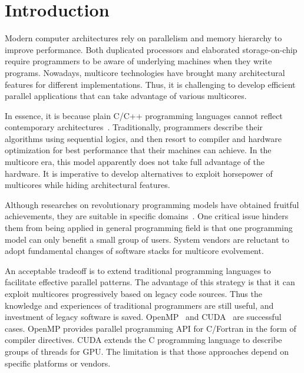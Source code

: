 \section{Introduction}
\label{sec:Intro}

Modern computer architectures rely on parallelism and memory
hierarchy to improve performance. Both duplicated processors and
elaborated storage-on-chip require programmers to be aware of underlying
machines when they write programs. Nowadays,
multicore technologies have brought many architectural features for
different implementations. Thus, it is challenging to develop
efficient parallel applications that can take advantage of various multicores.

In essence, it is because plain C/C++ programming languages
cannot reflect contemporary architectures~\cite{cml}. Traditionally, programmers
describe their algorithms using sequential logics, and then resort to compiler
and hardware optimization for best performance that their machines can achieve.
In the multicore era, this model apparently does not take full advantage of the
hardware. It is imperative to develop alternatives to exploit horsepower
of multicores while hiding architectural features.

Although researches on revolutionary programming models have obtained
fruitful achievements, they are suitable in specific
domains~\cite{gmapreduce, erlang, haskell}.
One critical issue hinders them from being applied in general programming
field is that one programming model can only
benefit a small group of users.
System vendors are reluctant to adopt fundamental changes of software stacks for
multicore evolvement.


An acceptable tradeoff is to extend traditional programming
languages to facilitate effective parallel patterns. The advantage of
this strategy is that it can exploit multicores progressively based on
legacy code sources. Thus the knowledge and
experiences of traditional programmers are still useful, and investment
of legacy software is saved. OpenMP~\cite{openmp}  and
CUDA~\cite{cuda} are successful cases. OpenMP provides parallel
programming API for C/Fortran in the form of compiler directives. CUDA
extends the C programming language to describe
groups of threads for GPU. The limitation is that those approaches
depend on specific platforms or vendors.

